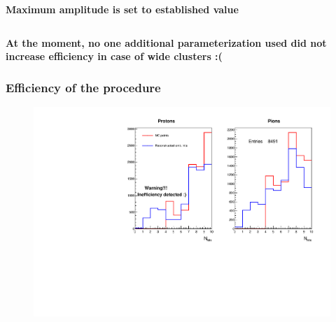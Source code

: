 \documentclass[dvipsnames] {beamer}
\begin{document}
\begin{frame}
\begin{columns}[t]
\begin{block}{\bf \centering Maximum amplitude is set to established value}
\begin{figure}[H]
                 \end{figure}
               \end{block}
               \end{columns}
               \begin{block}{}
                 \bf \color{blue} At the moment, no one additional parameterization used did not increase efficiency in case of wide clusters :(
               \end{block}
           \end{frame}

           \begin{frame}
             \frametitle{\bf \centering Efficiency of the procedure}
             \begin{block}{\bf \centering }
               \begin{figure}[H]
                 \includegraphics[width=1.\linewidth]{EmbeddingHitRecoEff.pdf}
               \end{figure}
             \end{block}
           \end{frame}
\end{document}
